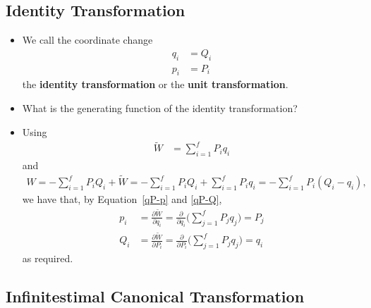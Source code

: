 \documentclass[10pt]{article}
\begin{document}
  \subsection{Identity Transformation}

  \begin{itemize}
    \item We call the coordinate change
    \begin{align*}
      q_i &= Q_i \\
      p_i &= P_i
    \end{align*}
    the {\bf identity transformation} or the {\bf unit transformation}.

    \item What is the generating function of the identity transformation?

    \item Using
    \begin{align*}
      \widetilde{W} &= \sum_{i=1}^f P_i q_i 
    \end{align*}
    and
    \begin{align*}
      W 
      = - \sum_{i=1}^f P_i Q_i  + \widetilde{W} 
      = - \sum_{i=1}^f P_i Q_i  + \sum_{i=1}^f P_i q_i 
      = - \sum_{i=1}^f P_i ( Q_i - q_i ),
    \end{align*}
    we have that, by Equation~\ref{qP-p} and \ref{qP-Q},
    \begin{align*}
      p_i 
      &= \frac{\partial \widetilde{W}}{\partial q_i} 
      = \frac{\partial}{\partial q_i} \bigg( \sum_{j=1}^f P_j q_j \bigg)
      = P_j \\
      Q_i 
      &= \frac{\partial \widetilde{W}}{\partial P_i} 
      = \frac{\partial}{\partial P_i} \bigg( \sum_{j=1}^f P_j q_j \bigg)
      = q_i
    \end{align*}
    as required.
  \end{itemize}

  \subsection{Infinitestimal Canonical Transformation}
\end{document}
